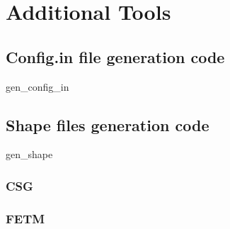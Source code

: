 
\chapter{Additional Tools}  %

\label{Chapter7}  %



\section{Config.in file generation code}

gen\_config\_in


\section{Shape files generation code}

gen\_shape

\subsection{CSG}


\subsection{FETM}


\section{}



